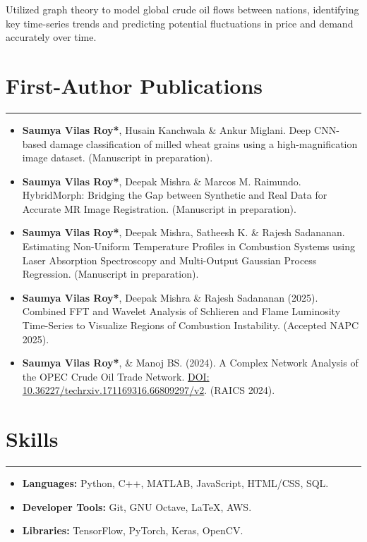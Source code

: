 \documentclass[11pt]{article}
\newlength{\sectionvspace}
\newlength{\sectionvspacee}
\begin{document}
\begin{itemize}[leftmargin=*,noitemsep,topsep=0pt]
\begin{itemize}[leftmargin=*,noitemsep,topsep=0pt]
Utilized graph theory to model global crude oil flows between nations, identifying key time-series trends and predicting potential fluctuations in price and demand accurately over time.
		
	\end{itemize}
	
	
		\section*{\bf First-Author Publications}
	\vspace{\sectionvspace}
	\rule{\textwidth}{0.4pt}
	\begin{itemize}[leftmargin=*,noitemsep,topsep=0pt]
		
		
		\item \textbf{Saumya Vilas Roy*}, Husain Kanchwala \& Ankur Miglani. Deep CNN-based damage classification of milled wheat grains using a high-magnification image dataset. (Manuscript in preparation).
		
		\item  \textbf{Saumya Vilas Roy*}, Deepak Mishra \& Marcos M. Raimundo. HybridMorph: Bridging the Gap between Synthetic and Real Data for Accurate MR Image Registration. (Manuscript in preparation).
		
		\item \textbf{Saumya Vilas Roy*}, Deepak Mishra, Satheesh K. \& Rajesh Sadananan. Estimating Non-Uniform Temperature Profiles in Combustion Systems using Laser Absorption Spectroscopy and Multi-Output Gaussian Process Regression. (Manuscript in preparation).
		
		\item \textbf{Saumya Vilas Roy*}, Deepak Mishra \& Rajesh Sadananan (2025). Combined FFT and Wavelet Analysis of Schlieren and Flame Luminosity Time-Series to Visualize Regions of Combustion Instability. (Accepted NAPC 2025).
		
		\item \textbf{Saumya Vilas Roy*}, \& Manoj BS. (2024). A Complex Network Analysis of the OPEC Crude Oil Trade Network. \href{https://doi.org/10.36227/techrxiv.171169316.66809297/v2}{DOI: 10.36227/techrxiv.171169316.66809297/v2}. (RAICS 2024).
		
	\end{itemize}
	
	\vspace{\sectionvspacee}
\section*{\bf Skills}
\vspace{\sectionvspace}
\rule{\textwidth}{0.4pt}
\begin{itemize}[leftmargin=*,noitemsep,topsep=0pt]
	\item \textbf{Languages:} Python, C++, MATLAB, JavaScript, HTML/CSS, SQL.
	\item \textbf{Developer Tools:} Git, GNU Octave, LaTeX, AWS.
	\item \textbf{Libraries:} TensorFlow, PyTorch, Keras, OpenCV.
\end{itemize}



\end{itemize}
\end{document}
